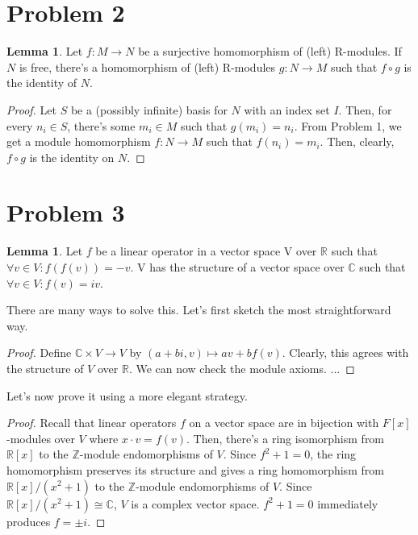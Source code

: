 \documentclass{article}
\theoremstyle{definition}
\newtheorem{lemma}[theorem]{Lemma}
\newcommand{\Z}{\mathbb{Z}}
\newcommand{\R}{\mathbb{R}}
\newcommand{\C}{\mathbb{C}}
\begin{document}
\section{Problem 2}

\begin{lemma}
    Let $f: M \xrightarrow{} N$ be a surjective homomorphism of (left) R-modules. If $N$ is free, there's a homomorphism of (left) R-modules $g:N \xrightarrow{} M$ such that $f \circ g$ is the identity of $N$.
\end{lemma}
\begin{proof}
    Let $S$ be a (possibly infinite) basis for $N$ with an index set $I$. Then, for every $n_{i} \in S$, there's some $m_{i} \in M$ such that $g(m_{i}) = n_{i}$. From Problem 1, we get a module homomorphism $f: N \xrightarrow{} M$ such that $f(n_{i}) = m_{i}$. Then, clearly, $f \circ g$ is the identity on $N$.
\end{proof}

\section{Problem 3}

\begin{lemma}
    Let $f$ be a linear operator in a vector space V over $\R$ such that $\forall v \in V: f(f(v)) = -v$. V has the structure of a vector space over $\C$ such that $\forall v \in V: f(v) = iv$.  
\end{lemma}

There are many ways to solve this. Let's first sketch the most straightforward way.

\begin{proof}
    Define $\C \times V \xrightarrow{} V$ by $(a + bi, v) \mapsto av + bf(v)$.
    Clearly, this agrees with the structure of $V$ over $\R$. We can now check the
    module axioms. ...
\end{proof}

Let's now prove it using a more elegant strategy.

\begin{proof}
    Recall that linear operators $f$ on a vector space are in bijection with
    $F[x]$-modules over $V$ where $x \cdot v = f(v)$. Then, there's a ring
    isomorphism from $\R[x]$ to the $\Z$-module endomorphisms of $V$. 
    Since $f^{2} + 1 = 0$, the ring homomorphism preserves its structure and
    gives a ring homomorphism from $\R[x]/(x^{2} + 1)$ to the $\Z$-module endomorphisms of $V$.
    Since $\R[x]/(x^{2} + 1) \cong \C$, $V$ is a complex vector space. $f^{2} + 1 = 0$ immediately
    produces $f = \pm i$.
\end{proof}
\end{document}
